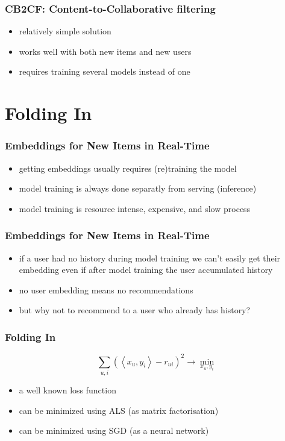 \documentclass[t]{beamer}
\begin{document}
\begin{frame}
  \frametitle{CB2CF: Content-to-Collaborative filtering}
  \begin{itemize}
  \item relatively simple solution
  \item works well with both new items and new users
  \item requires training several models instead of one  
  \end{itemize}
\end{frame}
\section{Folding In}
\begin{frame}
  \frametitle{Embeddings for New Items in Real-Time}
  \begin{itemize}
  \item getting embeddings usually requires (re)training the model
  \item model training is always done separatly from serving (inference)
  \item model training is resource intense, expensive, and slow process  
  \end{itemize}
\end{frame}
\begin{frame}
  \frametitle{Embeddings for New Items in Real-Time}
  \begin{itemize}
  \item if a user had no history during model training we can't easily get their embedding even if after model training the user accumulated history
  \item no user embedding means no recommendations
  \item but why not to recommend to a user who already has history?
  \end{itemize}
\end{frame}
\begin{frame}
  \frametitle{Folding In}
  $$\sum\limits_{u,i}\left(\left<x_u,y_i\right>-r_{ui}\right)^2\longrightarrow\min_{x_u,y_i}$$
  \begin{itemize}
  \item a well known loss function
  \item can be minimized using ALS (as matrix factorisation)
  \item can be minimized using SGD (as a neural network)
  \end{itemize}  
\end{frame}
\end{document}
